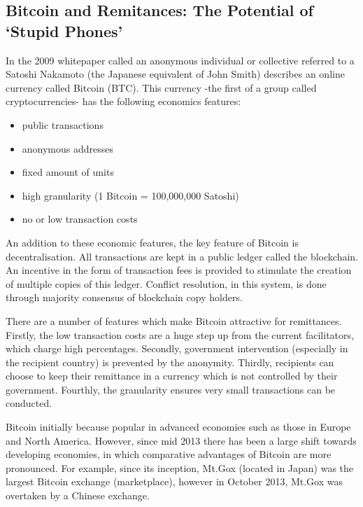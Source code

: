 \documentclass[a4paper]{report}
\begin{document}


\begin{refsection}
\chapter{Bitcoin and Remitances: The Potential of `Stupid Phones'}
\label{btc}
In the 2009 whitepaper \parencite{nakamoto2008bitcoin} called  an anonymous individual or collective referred to a Satoshi Nakamoto (the Japanese equivalent of John Smith) describes an online currency called Bitcoin (BTC). 
This currency -the first of a group called cryptocurrencies- has the following economics features:

\begin{itemize}
\item public transactions
\item anonymous addresses
\item fixed amount of units
\item high granularity (1 Bitcoin = 100,000,000 Satoshi)
\item no or low transaction costs
\end{itemize}

An addition to these economic features, the key feature of Bitcoin is decentralisation.
All transactions are kept in a public ledger called the blockchain. An incentive in the form of transaction fees is provided to stimulate the creation of multiple copies of this ledger.
Conflict resolution, in this system, is done through majority consensus of blockchain copy holders.

There are a number of features which make Bitcoin attractive for remittances. Firstly, the low transaction costs are a huge step up from the current facilitators, which charge high percentages. Secondly, government intervention (especially in the recipient country) is prevented by the anonymity. Thirdly, recipients can choose to keep their remittance in a currency which is not controlled by their government. Fourthly, the granularity ensures very small transactions can be conducted.

Bitcoin initially because popular in advanced economies such as those in Europe and North America.
However, since mid 2013 there has been a large shift towards developing economies,
in which comparative advantages of Bitcoin are more pronounced.
For example, since its inception, Mt.Gox (located in Japan) was the largest Bitcoin exchange (marketplace), however in October 2013, Mt.Gox was overtaken by a Chinese exchange.


\end{refsection}
\end{document}
